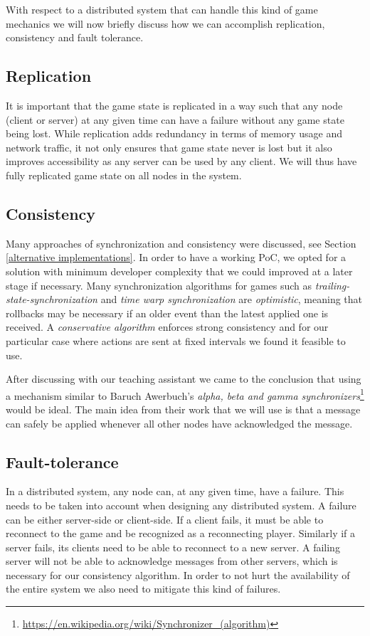 \documentclass[a4paper]{article}
\begin{document}
With respect to a distributed system that can handle this kind of game mechanics we will now briefly discuss how we can accomplish replication, consistency and fault tolerance.

\subsection{Replication}
It is important that the game state is replicated in a way such that any node (client or server) at any given time can have a failure without any game state being lost. While replication adds redundancy in terms of memory usage and network traffic, it not only ensures that game state never is lost but it also improves accessibility as any server can be used by any client. We will thus have fully replicated game state on all nodes in the system. 

\subsection{Consistency}
Many approaches of synchronization and consistency were discussed, see Section \ref{alternative implementations}. In order to have a working PoC, we opted for a solution with minimum developer complexity that we could improved at a later stage if necessary. Many synchronization algorithms for games such as \emph{trailing-state-synchronization} and \emph{time warp synchronization} are \emph{optimistic}, meaning that rollbacks may be necessary if an older event than the latest applied one is received. A \emph{conservative algorithm} enforces strong consistency and for our particular case where actions are sent at fixed intervals we found it feasible to use.  

After discussing with our teaching assistant we came to the conclusion that using a mechanism similar to Baruch Awerbuch's \emph{alpha, beta and gamma synchronizers}\footnote{\url{https://en.wikipedia.org/wiki/Synchronizer_(algorithm)}} would be ideal. The main idea from their work that we will use is that a message can safely be applied whenever all other nodes have acknowledged the message. 

\subsection{Fault-tolerance}
In a distributed system, any node can, at any given time, have a failure. This needs to be taken into account when designing any distributed system. A failure can be either server-side or client-side. If a client fails, it must be able to reconnect to the game and be recognized as a reconnecting player. Similarly if a server fails, its clients need to be able to reconnect to a new server. A failing server will not be able to acknowledge messages from other servers, which is necessary for our consistency algorithm. In order to not hurt the availability of the entire system we also need to mitigate this kind of failures.
\end{document}
